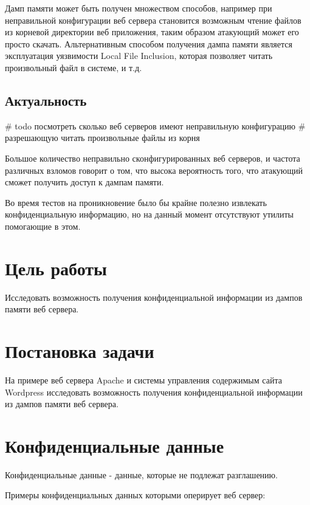 \documentclass[20pt]{article}
\begin{document}
Дамп памяти может быть получен множеством способов, например при неправильной
конфигурации веб сервера становится возможным чтение файлов из корневой
директории веб приложения, таким образом атакующий может его просто скачать.
Альтернативным способом получения дампа памяти является эксплуатация уязвимости
Local File Inclusion, которая позволяет читать произвольный файл в системе, и т.д.

\subsection{Актуальность}
\# todo посмотреть сколько веб серверов имеют неправильную конфигурацию
\# разрешающую читать произвольные файлы из корня

Большое количество неправильно сконфигурированных веб серверов, и частота различных
взломов говорит о том, что высока вероятность того, что атакующий сможет получить
доступ к дампам памяти.

Во время тестов на проникновение было бы крайне полезно извлекать конфиденциальную
информацию, но на данный момент отсутствуют утилиты помогающие в этом.

\newpage

\section{Цель работы}
Исследовать возможность получения конфиденциальной информации из дампов памяти веб сервера.

\newpage

\section{Постановка задачи}
На примере веб сервера Apache и системы управления содержимым сайта Wordpress
исследовать возможность получения конфиденциальной информации из дампов памяти
веб сервера.

\newpage

\section{Конфиденциальные данные}
Конфиденциальные данные - данные, которые не подлежат разглашению.

Примеры конфиденциальных данных которыми оперирует веб сервер:
\end{document}
